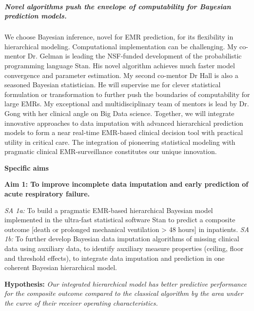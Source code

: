 \documentclass[11pt,notitlepage]{article}
\begin{document}
\subparagraph{Novel algorithms push the envelope of computability for Bayesian prediction models.} We choose Bayesian inference, novel for EMR prediction, for its flexibility in hierarchical modeling. Computational implementation can be challenging. My co-mentor Dr. Gelman is leading the NSF-funded development of the probabilistic programming language Stan. His novel algorithm achieves much faster model convergence and parameter estimation. My second co-mentor Dr Hall is also a seasoned Bayesian statistician. He will supervise me for clever statistical formulation or transformation to further push the boundaries of computability for large EMRs. My exceptional and multidisciplinary team of mentors is lead by Dr. Gong with her clinical angle on Big Data science. Together, we will integrate innovative approaches to data imputation with advanced hierarchical prediction models to form a near real-time EMR-based clinical decision tool with practical utility in critical care.  The integration of pioneering statistical modeling with pragmatic clinical EMR-surveillance constitutes our unique innovation.

\begin{center}
\textbf{Specific aims}
\end{center}
\vspace{-7pt}
\begin{flushleft}
\textbf{Aim 1: To improve incomplete data imputation and early prediction of acute respiratory failure.}
\end{flushleft}
\vspace{-2pt}
\textit{SA 1a:} To build a pragmatic EMR-based hierarchical Bayesian model implemented in the ultra-fast statistical software Stan to predict a composite outcome [death or prolonged mechanical ventilation > 48 hours] in inpatients.
\textit{SA 1b:} To further develop Bayesian data imputation algorithms of missing clinical data using auxiliary data, to identify auxiliary measure properties (ceiling, floor and threshold effects), to integrate data imputation and prediction in one coherent Bayesian hierarchical model.

\begin{flushleft}
\textbf{Hypothesis:} \textit{Our integrated hierarchical model has better predictive performance for the composite outcome compared to the classical algorithm by the area under the curve of their receiver operating characteristics.}
\end{flushleft}
\vspace{-10pt}
\end{document}
